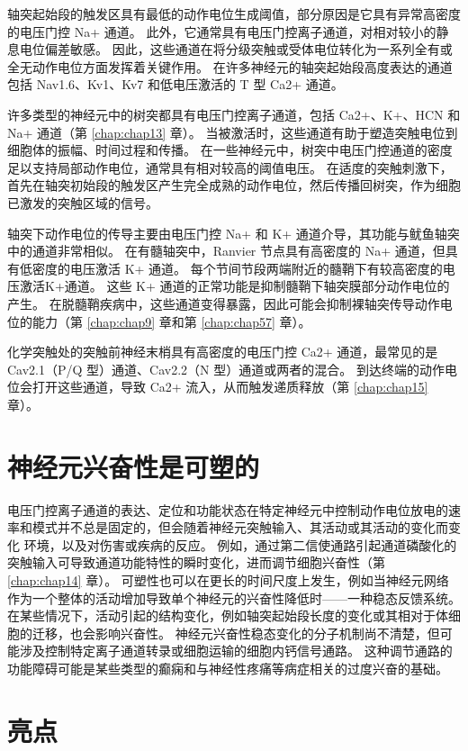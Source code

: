 轴突起始段的触发区具有最低的动作电位生成阈值，部分原因是它具有异常高密度的电压门控 Na+ 通道。 
此外，它通常具有电压门控离子通道，对相对较小的静息电位偏差敏感。 
因此，这些通道在将分级突触或受体电位转化为一系列全有或全无动作电位方面发挥着关键作用。 
在许多神经元的轴突起始段高度表达的通道包括 Nav1.6、Kv1、Kv7 和低电压激活的 T 型 Ca2+ 通道。


许多类型的神经元中的树突都具有电压门控离子通道，包括 Ca2+、K+、HCN 和 Na+ 通道（第 \ref{chap:chap13} 章）。 
当被激活时，这些通道有助于塑造突触电位到细胞体的振幅、时间过程和传播。 
在一些神经元中，树突中电压门控通道的密度足以支持局部动作电位，通常具有相对较高的阈值电压。 
在适度的突触刺激下，首先在轴突初始段的触发区产生完全成熟的动作电位，然后传播回树突，作为细胞已激发的突触区域的信号。


轴突下动作电位的传导主要由电压门控 Na+ 和 K+ 通道介导，其功能与鱿鱼轴突中的通道非常相似。 
在有髓轴突中，Ranvier 节点具有高密度的 Na+ 通道，但具有低密度的电压激活 K+ 通道。 
每个节间节段两端附近的髓鞘下有较高密度的电压激活K+通道。 
这些 K+ 通道的正常功能是抑制髓鞘下轴突膜部分动作电位的产生。 
在脱髓鞘疾病中，这些通道变得暴露，因此可能会抑制裸轴突传导动作电位的能力（第 \ref{chap:chap9} 章和第 \ref{chap:chap57} 章）。


化学突触处的突触前神经末梢具有高密度的电压门控 Ca2+ 通道，最常见的是 Cav2.1（P/Q 型）通道、Cav2.2（N 型）通道或两者的混合。 
到达终端的动作电位会打开这些通道，导致 Ca2+ 流入，从而触发递质释放（第 \ref{chap:chap15} 章）。


\section{神经元兴奋性是可塑的}

电压门控离子通道的表达、定位和功能状态在特定神经元中控制动作电位放电的速率和模式并不总是固定的，但会随着神经元突触输入、其活动或其活动的变化而变化 环境，以及对伤害或疾病的反应。 
例如，通过第二信使通路引起通道磷酸化的突触输入可导致通道功能特性的瞬时变化，进而调节细胞兴奋性（第 \ref{chap:chap14} 章）。 
可塑性也可以在更长的时间尺度上发生，例如当神经元网络作为一个整体的活动增加导致单个神经元的兴奋性降低时——一种稳态反馈系统。 
在某些情况下，活动引起的结构变化，例如轴突起始段长度的变化或其相对于体细胞的迁移，也会影响兴奋性。 
神经元兴奋性稳态变化的分子机制尚不清楚，但可能涉及控制特定离子通道转录或细胞运输的细胞内钙信号通路。 
这种调节通路的功能障碍可能是某些类型的癫痫和与神经性疼痛等病症相关的过度兴奋的基础。




\section{亮点}

